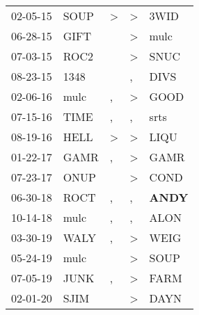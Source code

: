 \begin{supertabular}{p{0.07\textwidth}p{0.06\textwidth}p{0.02\textwidth}p{0.02\textwidth}p{0.06\textwidth}}
          02-05-15\textsuperscript{} &           SOUP\textsuperscript{} &  \textgreater &     \textgreater &           3WID\textsuperscript{} \\
          06-28-15\textsuperscript{} &           GIFT\textsuperscript{} &               &     \textgreater &           mulc\textsuperscript{} \\
          07-03-15\textsuperscript{} &           ROC2\textsuperscript{} &               &     \textgreater &           SNUC\textsuperscript{} \\
          08-23-15\textsuperscript{} &           1348\textsuperscript{} &               &                , &           DIVS\textsuperscript{} \\
          02-06-16\textsuperscript{} &           mulc\textsuperscript{} &             , &     \textgreater &           GOOD\textsuperscript{} \\
          07-15-16\textsuperscript{} &           TIME\textsuperscript{} &             , &                , &           srts\textsuperscript{} \\
          08-19-16\textsuperscript{} &           HELL\textsuperscript{} &  \textgreater &     \textgreater &           LIQU\textsuperscript{} \\
          01-22-17\textsuperscript{} &           GAMR\textsuperscript{} &             , &     \textgreater &           GAMR\textsuperscript{} \\
          07-23-17\textsuperscript{} &           ONUP\textsuperscript{} &               &     \textgreater &           COND\textsuperscript{} \\
          06-30-18\textsuperscript{} &           ROCT\textsuperscript{} &             , &                , &  \textbf{ANDY\textsuperscript{}} \\
          10-14-18\textsuperscript{} &           mulc\textsuperscript{} &             , &                , &           ALON\textsuperscript{} \\
          03-30-19\textsuperscript{} &           WALY\textsuperscript{} &             , &     \textgreater &           WEIG\textsuperscript{} \\
          05-24-19\textsuperscript{} &           mulc\textsuperscript{} &               &     \textgreater &           SOUP\textsuperscript{} \\
          07-05-19\textsuperscript{} &           JUNK\textsuperscript{} &             , &     \textgreater &           FARM\textsuperscript{} \\
          02-01-20\textsuperscript{} &           SJIM\textsuperscript{} &               &     \textgreater &           DAYN\textsuperscript{} \\
\end{supertabular}
